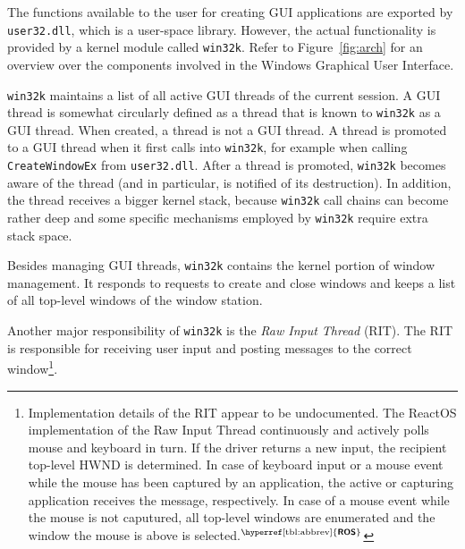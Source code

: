 \documentclass[10pt,twocolumn,a4paper]{article}
\newcommand{\bs}[1]{\textbf{\sffamily #1}}
\newcommand{\winver}[1]{$^{\text{\hyperref[tbl:abbrev]{\bs{#1}}}}$}
\begin{document}
		The functions available to the user for creating GUI applications are
		exported by \texttt{user32.dll}, which is a user-space library.
		However, the actual functionality is provided by a kernel module called
		\texttt{win32k}. Refer to Figure~\ref{fig:arch} for an overview over the
		components involved in the Windows Graphical User Interface. \cite{probertwin32k}

		\texttt{win32k} maintains a list of all active GUI threads of the
		current session. A GUI thread is somewhat circularly defined as a
		thread that is known to \texttt{win32k} as a GUI thread. When created,
		a thread is not a GUI thread. A thread is promoted to a GUI thread when
		it first calls into \texttt{win32k}, for example when calling
		\texttt{CreateWindowEx} from \texttt{user32.dll}. After a thread is
		promoted, \texttt{win32k} becomes aware of the thread (and in
		particular, is notified of its destruction). In addition, the thread
		receives a bigger kernel stack, because \texttt{win32k} call chains
		can become rather deep and some specific mechanisms employed by \texttt{win32k}
		require extra stack space.
		\cite{probertwin32k,mandy2011kernel}

		Besides managing GUI threads, \texttt{win32k} contains the kernel portion
		of window management. It responds to requests to create and close windows
		and keeps a list of all top-level windows of the window station.
		\cite{probertwin32k,goingdeep}

		Another major responsibility of \texttt{win32k} is the \textit{Raw Input
		Thread} (RIT). The RIT is responsible for receiving user input and posting
		messages to the correct window\footnote{Implementation details of the
		RIT appear to be undocumented. The ReactOS implementation of
		the Raw Input Thread continuously and actively polls mouse and keyboard
		in turn. If the driver returns a new input, the recipient top-level HWND
		is determined. In case of keyboard input or a mouse event while the mouse
		has been captured by an application, the active or capturing application
		receives the message, respectively. In case of a mouse event while the
		mouse is not caputured, all top-level windows are enumerated and the
		window the mouse is above is selected.\winver{ROS}}.
		\cite{probertwin32k}
\end{document}
